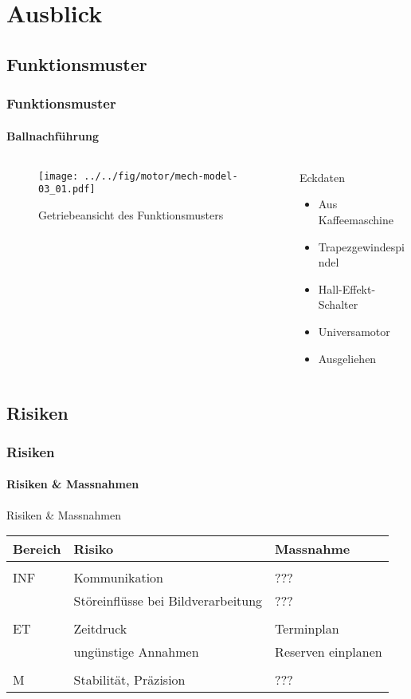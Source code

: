 \section{Ausblick}

\subsection{Funktionsmuster}
\begin{frame}
	\frametitle{Funktionsmuster\hfill{}\footnotesize \group}
	\framesubtitle{Ballnachführung}
	\begin{columns}
		\begin{column}{0.5\textwidth}
			\begin{figure}
				\texttt{[image: ../../fig/motor/mech-model-03\_01.pdf]}
				\caption{Getriebeansicht des Funktionsmusters}
			\end{figure}
		\end{column}
		\begin{column}{0.5\textwidth}
			\begin{block}{Eckdaten}
				\begin{itemize}
					\item Aus Kaffeemaschine
					\item Trapezgewindespindel
					\item Hall-Effekt-Schalter
					\item Universamotor
					\item Ausgeliehen
				\end{itemize}
			\end{block}
		\end{column}
	\end{columns}
\end{frame}

\subsection{Risiken}
\begin{frame}
	\frametitle{Risiken \hfill{} \footnotesize \group}
	\framesubtitle{Risiken \& Massnahmen}
	\begin{block}{Risiken \& Massnahmen}
		\begin{tabular}{l l l}
			Bereich
				& Risiko
				& Massnahme \\
			\hline
			& & \\
			INF	& Kommunikation
				& ??? \\
				& Störeinflüsse bei Bildverarbeitung
				& ??? \\
			& & \\
			ET	& Zeitdruck
				& Terminplan \\
				& ungünstige Annahmen
				& Reserven einplanen \\
			& & \\
			M	& Stabilität, Präzision
				& ??? \\
		\end{tabular}
	\end{block}
\end{frame}

